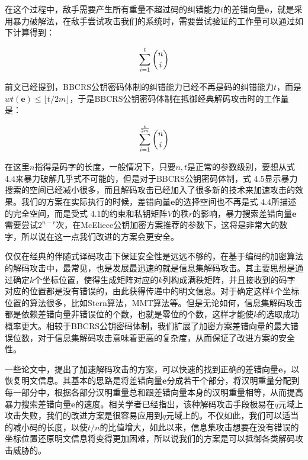 在这个过程中，敌手需要产生所有重量不超过码的纠错能力$t$的差错向量$\mathbf{e}$，就是采用暴力破解法，在敌手尝试攻击我们的系统时，需要尝试验证的工作量可以通过如下计算得到：

\begin{equation}\label{Eq:numberOfErrorVectionInOriginalAttack}
\sum_{i=1}^{t} \dbinom{n}{i}
\end{equation}

前文已经提到，BBCRS公钥密码体制的纠错能力已经不再是码的纠错能力$t$，而是$wt(\mathbf{e}) \leq \lfloor t/2m \rfloor$，于是BBCRS公钥密码体制在抵御经典解码攻击时的工作量是：

\begin{equation}\label{Eq:numberOfErrorVectionInBBCRSScheme}
\sum_{i=1}^{\frac{t}{2m}} \dbinom{n}{i}
\end{equation}

在这里$n$指得是码字的长度，一般情况下，只要$n,t$是正常的参数级别，要想从式 4.4来暴力破解几乎式不可能的，但是对于BBCRS公钥密码体制，式 4.5显示暴力搜索的空间已经减小很多，而且解码攻击已经加入了很多新的技术来加速攻击的效果。我们的方案在实际执行的时候，差错向量$\mathbf{e}$的选择空间也不再是式 4.4所描述的完全空间，而是受式 4.1的约束和私钥矩阵$V$的秩$r$的影响，暴力搜索差错向量$\mathbf{e}$需要尝试$2^{n-r}$次，在McEliece公钥加密方案推荐的参数下，这将是非常大的数字，所以说在这一点我们改进的方案会更安全。

仅仅在经典的伴随式译码攻击下保证安全性是远远不够的，在基于编码的加密算法的解码攻击中，最常见，也是发展最迅速的就是信息集解码攻击。其主要思想是通过确定$k$个坐标位置，使得生成矩阵对应的$k$列构成满秩矩阵，并且接收到的码字对应的位置都是没有错误的，由此获得传递中的明文信息。对于确定这样$k$个坐标位置的算法很多，比如Stern算法，MMT算法等。但是无论如何，信息集解码攻击都是依赖差错向量非错误位的个数，也就是零位的个数，这样才能使$k$的选取成功概率更大。相较于BBCRS公钥密码体制，我们扩展了加密方案差错向量的最大错误位数，对于信息集解码攻击意味着更高的复杂度，从而保证了改进方案的安全性。

一些论文中，提出了加速解码攻击的方案，可以快速的找到正确的差错向量$\mathbf{e}$，以恢复明文信息。其基本的思路是将差错向量$\mathbf{e}$分成若干个部分，将汉明重量分配到每一部分中，根据各部分汉明重量总和跟差错向量本身的汉明重量相等，从而提高暴力搜索差错向量$\mathbf{e}$的速度。相关学者已经指出，该种解码攻击手段极易在$q$元域上攻击失败，我们的改进方案是很容易应用到$q$元域上的。不仅如此，我们可以适当的减小码的长度，以使$t/n$的比值增大，如此以来，信息集攻击想要在没有错误的坐标位置还原明文信息将变得更加困难，所以说我们的方案是可以抵御各类解码攻击威胁的。

